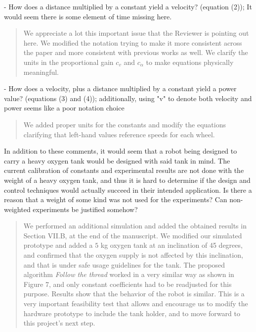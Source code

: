 \documentclass[journal,onecolumn,12pt]{IEEEtran}
\begin{document}
- How does a distance multiplied by a constant yield a velocity? (equation (2)); It would seem there is some element of time missing here.  

\begin{quotation}
{\color{blue}
We appreciate a lot this important issue that the Reviewer is pointing out here.  We modified the notation trying to make it more consistent across the paper and more consistent with previous works as well.  We clarify the units in the proportional gain $c_v$ and $c_{\alpha}$ to make equations physically meaningful.
}
\end{quotation}


- How does a velocity, plus a distance multiplied by a constant yield a power value? (equations (3) and (4)); additionally, using "v" to denote both velocity and power seems like a poor notation choice

\begin{quotation}
{\color{blue}
We added proper units for the constants and modify the equations clarifying that left-hand values reference speeds for each wheel.
}
\end{quotation}

In addition to these comments, it would seem that a robot being designed to carry a heavy oxygen tank would be designed with said tank in mind. The current calibration of constants and experimental results are not done with the weight of a heavy oxygen tank, and thus it is hard to determine if the design and control techniques would actually succeed in their intended application. Is there a reason that a weight of some kind was not used for the experiments? Can non-weighted experiments be justified somehow?

\begin{quotation}
{\color{blue}
We performed an additional simulation and added the obtained results in Section VII.B, at the end of the manuscript.  We modified our simulated prototype and added a $5$ kg oxygen tank at an inclination of 45 degrees, and confirmed that the oxygen supply is not affected by this inclination, and that is under safe usage guidelines for the tank.  The proposed algorithm \textit{Follow the thread} worked in a very similar way as shown in Figure 7, and only constant coefficients had to be readjusted for this purpose.  Results show that the behavior of the robot is similar.  This is a very important feasibility test that allows and encourage us to modify the hardware prototype to include the tank holder, and to move forward to this project's next step.
}
\end{quotation}
\end{document}
